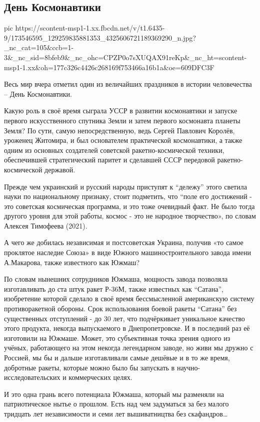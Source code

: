  
 
 
 
 

\subsection{День Космонавтики}


\ifcmt
  pic https://scontent-msp1-1.xx.fbcdn.net/v/t1.6435-9/173546595_129259835881353_4325606721189369290_n.jpg?_nc_cat=105&ccb=1-3&_nc_sid=8bfeb9&_nc_ohc=CPZP0o7sXUQAX91reKp&_nc_ht=scontent-msp1-1.xx&oh=177c326c4426c268169f753466a16b1a&oe=609DFC3F
\fi


Весь мир вчера отметил один из величайших праздников в истории человечества – День Космонавтики. 

Какую роль в своё время сыграла УССР в развитии космонавтики и запуске первого
искусственного спутника Земли и затем первого космонавта планеты Земля? По
сути, самую непосредственную, ведь Сергей Павлович Королёв, уроженец Житомира,
и был основателем практической космонавтики, а также одним из основных
создателей советской ракетно-космической техники, обеспечившей стратегический
паритет и сделавшей СССР передовой ракетно-космической державой. 

Прежде чем украинский и русский народы приступят к “дележу” этого светила науки
по национальному признаку, стоит подметить, что “поле его достижений - это
советская космическая программа, и это тоже очевидный факт. Не было тогда
другого уровня для этой работы, космос - это не народное творчество», по словам
Алексея Тимофеева (2021).

А чего же добилась независимая и постсоветская Украина, получив «то самое
проклятое наследие Союза» в виде Южного машиностроительного завода имени
А.Макарова, также известного как Южмаш?

По словам нынешних сотрудников Южмаша, мощность завода позволяла изготавливать
до ста штук ракет Р-36М, также известных как “Сатана”, изобретение которой
сделало в своё время бессмысленной американскую систему противоракетной
обороны. Срок использования боевой ракеты “Сатана” без существенных отступлений
- до 30 лет, что подчёркивает уникальное качество этого продукта, некогда
выпускаемого в Днепропетровске. И в последний раз её изготовили на Южмаше.
Может, это субъективная точка зрения одного из учёных, работающего на этом
некогда легендарном заводе, но живи мы дружно с Россией, мы бы и дальше
изготавливали самые дешёвые и в то же время, добротные ракеты, которые можно
было бы запускать в научно-исследовательских и коммерческих целях.

И это одна грань всего потенциала  Южмаша, который мы разменяли на
патриотическое нытье о прошлом.  Есть над чем задуматься за без малого тридцать
лет независимости и семи лет вышиватництва без скафандров…
